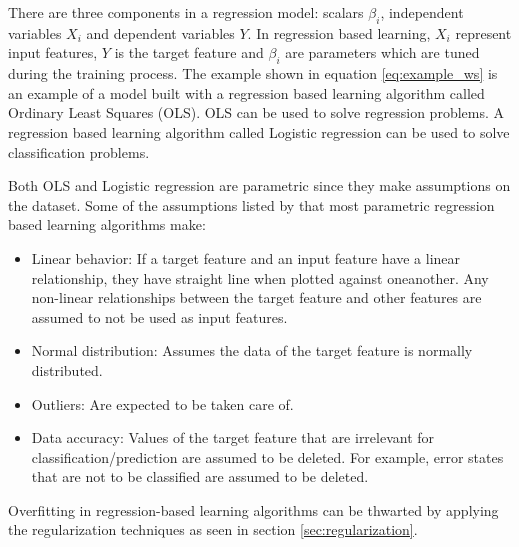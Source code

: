 		There are three components in a regression model: scalars $\beta_i$, independent variables $X_i$ and dependent variables $Y$. In regression based learning, $X_i$ represent input features, $Y$ is the target feature and $\beta_i$ are parameters which are tuned during the training process. The example shown in equation \ref{eq:example_ws} is an example of a model built with a regression based learning algorithm called Ordinary Least Squares (OLS). OLS can be used to solve regression problems. A regression based learning algorithm called Logistic regression can be used to solve classification problems. 

		Both OLS and Logistic regression are parametric since they make assumptions on the dataset. Some of the assumptions listed by \cite{BOOK:6} that most parametric regression based learning algorithms make:
	\begin{itemize}
		\item{Linear behavior:} If a target feature and an input feature have a linear relationship, they have straight line when plotted against oneanother. Any non-linear relationships between the target feature and other features are assumed to not be used as input features.
		\item{Normal distribution:} Assumes the data of the target feature is normally distributed.
		\item{Outliers:} Are expected to be taken care of.
		\item{Data accuracy:} Values of the target feature that are irrelevant for classification/prediction are assumed to be deleted. For example, error states that are not to be classified are assumed to be deleted.
	\end{itemize} %

		Overfitting in regression-based learning algorithms can be thwarted by applying the regularization techniques as seen in section \ref{sec:regularization}. %

